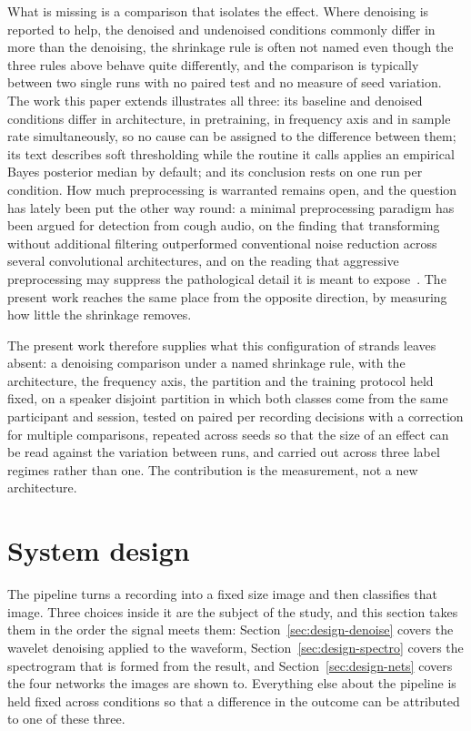 \documentclass[pdflatex,sn-mathphys-num]{sn-jnl}
\begin{document}
What is missing is a comparison that isolates the effect. Where denoising is reported to
help, the denoised and undenoised conditions commonly differ in more than the denoising,
the shrinkage rule is often not named even though the three rules above behave quite
differently, and the comparison is typically between two single runs with no paired test
and no measure of seed variation. The work this paper extends illustrates all three: its
baseline and denoised conditions differ in architecture, in pretraining, in frequency axis
and in sample rate simultaneously, so no cause can be assigned to the difference between
them; its text describes soft thresholding while the routine it calls applies an empirical
Bayes posterior median by default; and its conclusion rests on one run per condition. How much preprocessing is warranted remains open, and the
question has lately been put the other way round: a minimal preprocessing
paradigm has been argued for detection from cough audio, on the finding that
transforming without additional filtering outperformed conventional noise
reduction across several convolutional architectures, and on the reading that
aggressive preprocessing may suppress the pathological detail it is meant to
expose~\cite{lim2026}. The present work reaches the same place from the
opposite direction, by measuring how little the shrinkage removes.

The present work therefore supplies what this configuration of strands leaves absent: a
denoising comparison under a named shrinkage rule, with the architecture, the frequency
axis, the partition and the training protocol held fixed, on a speaker disjoint partition
in which both classes come from the same participant and session, tested on paired per
recording decisions with a correction for multiple comparisons, repeated across seeds so
that the size of an effect can be read against the variation between runs, and carried
out across three label regimes rather than one. The contribution is the measurement, not
a new architecture.

\section{System design}\label{sec:design}

The pipeline turns a recording into a fixed size image and then classifies that image.
Three choices inside it are the subject of the study, and this section takes them in the
order the signal meets them: Section~\ref{sec:design-denoise} covers the wavelet
denoising applied to the waveform, Section~\ref{sec:design-spectro} covers the
spectrogram that is formed from the result, and Section~\ref{sec:design-nets} covers the
four networks the images are shown to. Everything else about the pipeline is held fixed
across conditions so that a difference in the outcome can be attributed to one of these
three.
\end{document}
